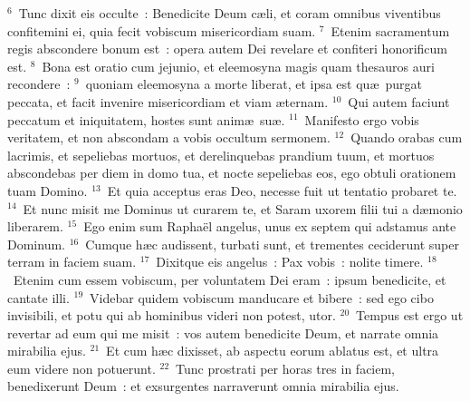 ${}^{6}$~Tunc dixit eis occulte~: Benedicite Deum c\ae li, et coram omnibus viventibus confitemini ei, quia fecit vobiscum misericordiam suam.
${}^{7}$~Etenim sacramentum regis abscondere bonum est~: opera autem Dei revelare et confiteri honorificum est.
${}^{8}$~Bona est oratio cum jejunio, et eleemosyna magis quam thesauros auri recondere~:
${}^{9}$~quoniam eleemosyna a morte liberat, et ipsa est qu\ae\ purgat peccata, et facit invenire misericordiam et viam \ae ternam.
${}^{10}$~Qui autem faciunt peccatum et iniquitatem, hostes sunt anim\ae\ su\ae .
${}^{11}$~Manifesto ergo vobis veritatem, et non abscondam a vobis occultum sermonem.
${}^{12}$~Quando orabas cum lacrimis, et sepeliebas mortuos, et derelinquebas prandium tuum, et mortuos abscondebas per diem in domo tua, et nocte sepeliebas eos, ego obtuli orationem tuam Domino.
${}^{13}$~Et quia acceptus eras Deo, necesse fuit ut tentatio probaret te.
${}^{14}$~Et nunc misit me Dominus ut curarem te, et Saram uxorem filii tui a d\ae monio liberarem.
${}^{15}$~Ego enim sum Rapha\"el angelus, unus ex septem qui adstamus ante Dominum.
${}^{16}$~Cumque h\ae c audissent, turbati sunt, et trementes ceciderunt super terram in faciem suam.
${}^{17}$~Dixitque eis angelus~: Pax vobis~: nolite timere.
${}^{18}$~Etenim cum essem vobiscum, per voluntatem Dei eram~: ipsum benedicite, et cantate illi.
${}^{19}$~Videbar quidem vobiscum manducare et bibere~: sed ego cibo invisibili, et potu qui ab hominibus videri non potest, utor.
${}^{20}$~Tempus est ergo ut revertar ad eum qui me misit~: vos autem benedicite Deum, et narrate omnia mirabilia ejus.
${}^{21}$~Et cum h\ae c dixisset, ab aspectu eorum ablatus est, et ultra eum videre non potuerunt.
${}^{22}$~Tunc prostrati per horas tres in faciem, benedixerunt Deum~: et exsurgentes narraverunt omnia mirabilia ejus.
